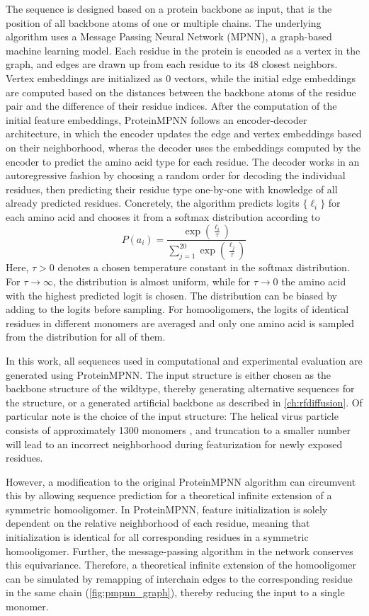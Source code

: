 The sequence is designed based on a protein backbone as input, that is the position of all backbone atoms of one or multiple chains. The underlying algorithm uses a Message Passing Neural Network (MPNN), a graph-based machine learning model. Each residue in the protein is encoded as a vertex in the graph, and edges are drawn up from each residue to its 48 closest neighbors. Vertex embeddings are initialized as 0 vectors, while the initial edge embeddings are computed based on the distances between the backbone atoms of the residue pair and the difference of their residue indices. After the computation of the initial feature embeddings, ProteinMPNN follows an encoder-decoder architecture, in which the encoder updates the edge and vertex embeddings based on their neighborhood, wheras the decoder uses the embeddings computed by the encoder to predict the amino acid type for each residue. The decoder works in an autoregressive fashion by choosing a random order for decoding the individual residues, then predicting their residue type one-by-one with knowledge of all already predicted residues. Concretely, the algorithm predicts logits $\{\ell_i\}$ for each amino acid and chooses it from a softmax distribution according to
$$P(a_i) = \frac{\exp\left( \frac{\ell_i}{\tau} \right)}{\sum_{j=1}^{20} \exp\left( \frac{\ell_j}{\tau} \right)}$$
Here, $\tau>0$ denotes a chosen temperature constant in the softmax distribution. For $\tau\rightarrow\infty$, the distribution is almost uniform, while for $\tau\rightarrow 0$ the amino acid with the highest predicted logit is chosen. The distribution can be biased by adding to the logits before sampling. For homooligomers, the logits of identical residues in different monomers are averaged and only one amino acid is sampled from the distribution for all of them. 

In this work, all sequences used in computational and experimental evaluation are generated using ProteinMPNN. The input structure is either chosen as the backbone structure of the wildtype, thereby generating alternative sequences for the structure, or a generated artificial backbone as described in \autoref{ch:rfdiffusion}. Of particular note is the choice of the input structure: The helical virus particle consists of approximately 1300 monomers \cite{Grinzato2020}, and truncation to a smaller number will lead to an incorrect neighborhood during featurization for newly exposed residues. 

However, a modification to the original ProteinMPNN algorithm can circumvent this by allowing sequence prediction for a theoretical infinite extension of a symmetric homooligomer. In ProteinMPNN, feature initialization is solely dependent on the relative neighborhood of each residue, meaning that initialization is identical for all corresponding residues in a symmetric homooligomer. Further, the message-passing algorithm in the network conserves this equivariance. Therefore, a theoretical infinite extension of the homooligomer can be simulated by remapping of interchain edges to the corresponding residue in the same chain (\autoref{fig:pmpnn_graph}), thereby reducing the input to a single monomer. 


